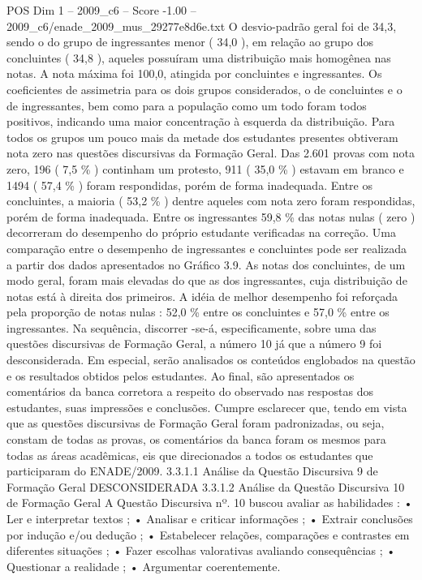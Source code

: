 \begin{textsample}{POS Dim 1 – 2009\_c6 – Score -1.00 – 2009\_c6/enade\_2009\_mus\_29277e8d6e.txt}
O desvio-padrão geral foi de 34,3, sendo o do grupo de ingressantes menor ( 34,0 ), em relação ao grupo dos concluintes ( 34,8 ), aqueles possuíram uma distribuição mais homogênea nas notas.
A nota máxima foi 100,0, atingida por concluintes e ingressantes.
Os coeficientes de assimetria para os dois grupos considerados, o de concluintes e o de ingressantes, bem como para a população como um todo foram todos positivos, indicando uma maior concentração à esquerda da distribuição.
Para todos os grupos um pouco mais da metade dos estudantes presentes obtiveram nota zero nas questões discursivas da Formação Geral.
Das 2.601 provas com nota zero, 196 ( 7,5 \% ) continham um protesto, 911 ( 35,0 \% ) estavam em branco e 1494 ( 57,4 \% ) foram respondidas, porém de forma inadequada.
Entre os concluintes, a maioria ( 53,2 \% ) dentre aqueles com nota zero foram respondidas, porém de forma inadequada.
Entre os ingressantes 59,8 \% das notas nulas ( zero ) decorreram do desempenho do próprio estudante verificadas na correção.
Uma comparação entre o desempenho de ingressantes e concluintes pode ser realizada a partir dos dados apresentados no Gráfico 3.9.
As notas dos concluintes, de um modo geral, foram mais elevadas do que as dos ingressantes, cuja distribuição de notas está à direita dos primeiros.
A idéia de melhor desempenho foi reforçada pela proporção de notas nulas : 52,0 \% entre os concluintes e 57,0 \% entre os ingressantes.
Na sequência, discorrer -se-á, especificamente, sobre uma das questões discursivas de Formação Geral, a número 10 já que a número 9 foi desconsiderada.
Em especial, serão analisados os conteúdos englobados na questão e os resultados obtidos pelos estudantes.
Ao final, são apresentados os comentários da banca corretora a respeito do observado nas respostas dos estudantes, suas impressões e conclusões.
Cumpre esclarecer que, tendo em vista que as questões discursivas de Formação Geral foram padronizadas, ou seja, constam de todas as provas, os comentários da banca foram os mesmos para todas as áreas acadêmicas, eis que direcionados a todos os estudantes que participaram do ENADE/2009. 3.3.1.1 Análise da Questão Discursiva 9 de Formação Geral DESCONSIDERADA 3.3.1.2 Análise da Questão Discursiva 10 de Formação Geral A Questão Discursiva nº. 10 buscou avaliar as habilidades : • Ler e interpretar textos ; • Analisar e criticar informações ; • Extrair conclusões por indução e/ou dedução ; • Estabelecer relações, comparações e contrastes em diferentes situações ; • Fazer escolhas valorativas avaliando consequências ; • Questionar a realidade ; • Argumentar coerentemente.

\end{textsample}
